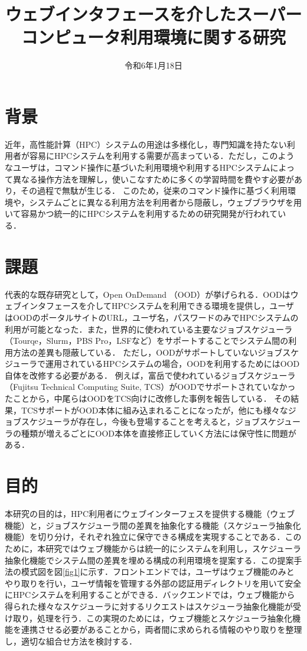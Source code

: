 \documentclass[a4paper,oneside,twocolumn,notitlepage,dvipdfmx]{jsarticle}
\date{令和6年1月18日}
\title{ウェブインタフェースを介したスーパーコンピュータ利用環境に関する研究}
\begin{document}
\maketitle
\section{背景}
近年，高性能計算（HPC）システムの用途は多様化し，専門知識を持たない利用者が容易にHPCシステムを利用する需要が高まっている．ただし，このようなユーザは，コマンド操作に基づいた利用環境や利用するHPCシステムによって異なる操作方法を理解し，使いこなすために多くの学習時間を費やす必要があり，その過程で無駄が生じる．
このため，従来のコマンド操作に基づく利用環境や，システムごとに異なる利用方法を利用者から隠蔽し，ウェブブラウザを用いて容易かつ統一的にHPCシステムを利用するための研究開発が行われている．\par

\section{課題}
代表的な既存研究として，Open OnDemand （OOD）が挙げられる\cite{citation_2}\cite{citation_3}．OODはウェブインタフェースを介してHPCシステムを利用できる環境を提供し，ユーザはOODのポータルサイトのURL，ユーザ名，パスワードのみでHPCシステムの利用が可能となった．また，世界的に使われている主要なジョブスケジューラ（Tourqe，Slurm，PBS Pro，LSFなど）をサポートすることでシステム間の利用方法の差異も隠蔽している．
ただし，OODがサポートしていないジョブスケジューラで運用されているHPCシステムの場合，OODを利用するためにはOOD自体を改修する必要がある．
例えば，富岳で使われているジョブスケジューラ（Fujitsu Technical Computing Suite, TCS）がOODでサポートされていなかったことから，中尾らはOODをTCS向けに改修した事例を報告している\cite{citation_1}．
その結果，TCSサポートがOOD本体に組み込まれることになったが，他にも様々なジョブスケジューラが存在し，今後も登場することを考えると，ジョブスケジューラの種類が増えるごとにOOD本体を直接修正していく方法には保守性に問題がある．\par

\section{目的}
本研究の目的は，HPC利用者にウェブインターフェスを提供する機能（ウェブ機能）と，ジョブスケジューラ間の差異を抽象化する機能（スケジューラ抽象化機能）を切り分け，それぞれ独立に保守できる構成を実現することである．このために，本研究ではウェブ機能からは統一的にシステムを利用し，スケジューラ抽象化機能でシステム間の差異を埋める構成の利用環境を提案する．この提案手法の模式図を図\ref{fig1}に示す．フロントエンドでは，ユーザはウェブ機能のみとやり取りを行い，ユーザ情報を管理する外部の認証用ディレクトリを用いて安全にHPCシステムを利用することができる．バックエンドでは，ウェブ機能から得られた様々なスケジューラに対するリクエストはスケジューラ抽象化機能が受け取り，処理を行う．この実現のためには，ウェブ機能とスケジューラ抽象化機能を連携させる必要があることから，両者間に求められる情報のやり取りを整理し，適切な組合せ方法を検討する．\par
\end{document}
